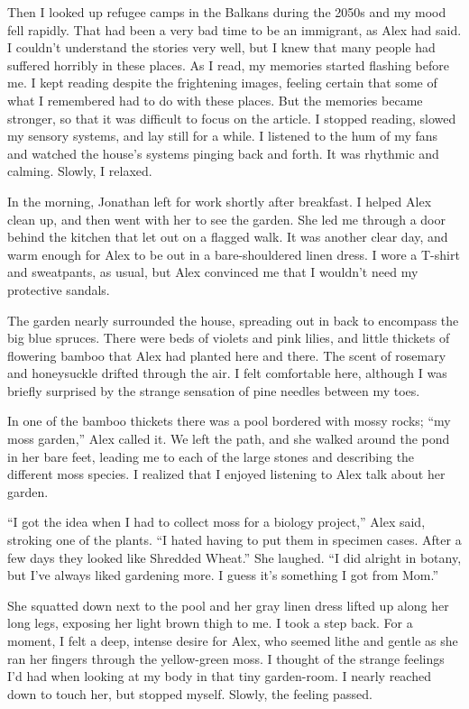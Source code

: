 \documentclass[10pt,b5paper]{article}
\begin{document}
Then I looked up refugee camps in the Balkans during the 2050s and my
mood fell rapidly. That had been a very bad time to be an immigrant,
as Alex had said. I couldn't understand the stories very well, but I
knew that many people had suffered horribly in these places. As I read,
my memories started flashing before me. I kept reading despite the
frightening images, feeling certain that some of what I remembered
had to do with these places. But the memories became stronger, so
that it was difficult to focus on the article. I stopped reading,
slowed my sensory systems, and lay still for a while. I listened to
the hum of my fans and watched the house's systems pinging back and
forth. It was rhythmic and calming. Slowly, I relaxed.

\bigskip

In the morning, Jonathan left for work shortly after breakfast. I
helped Alex clean up, and then went with her to see the garden. She led
me through a door behind the kitchen that let out on a flagged walk.
It was another clear day, and warm enough for Alex to be out in a
bare-shouldered linen dress. I wore a T-shirt and sweatpants, as usual,
but Alex convinced me that I wouldn't need my protective sandals.

The garden nearly surrounded the house, spreading out in back to
encompass the big blue spruces. There were beds of violets and pink
lilies, and little thickets of flowering bamboo that Alex had planted
here and there. The scent of rosemary and honeysuckle drifted through
the air. I felt comfortable here, although I was briefly surprised
by the strange sensation of pine needles between my toes.

In one of the bamboo thickets there was a pool bordered with mossy
rocks; ``my moss garden,'' Alex called it. We left the path, and she
walked around the pond in her bare feet, leading me to each of the
large stones and describing the different moss species. I realized
that I enjoyed listening to Alex talk about her garden.

``I got the idea when I had to collect moss for a biology project,''
Alex said, stroking one of the plants. ``I hated having to put them
in specimen cases. After a few days they looked like Shredded Wheat.''
She laughed. ``I did alright in botany, but I've always liked gardening
more. I guess it's something I got from Mom.''

She squatted down next to the pool and her gray linen dress lifted
up along her long legs, exposing her light brown thigh to me. I took
a step back. For a moment, I felt a deep, intense desire for Alex,
who seemed lithe and gentle as she ran her fingers through the
yellow-green moss.  I thought of the strange feelings I'd had when
looking at my body in that tiny garden-room. I nearly reached down
to touch her, but stopped myself. Slowly, the feeling passed.
\end{document}

